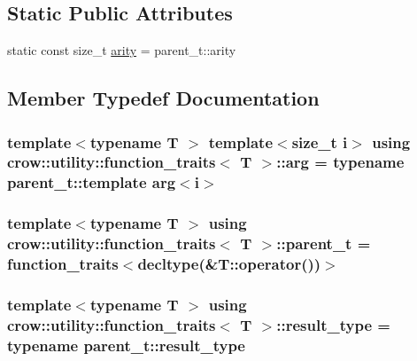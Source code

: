 \subsection*{Static Public Attributes}
\begin{DoxyCompactItemize}
\item 
static const size\-\_\-t \hyperlink{structcrow_1_1utility_1_1function__traits_a6736e81b2deba53e7441119cbbe04617}{arity} = parent\-\_\-t\-::arity
\end{DoxyCompactItemize}


\subsection{Member Typedef Documentation}
\hypertarget{structcrow_1_1utility_1_1function__traits_a1ccba1b795f8479631b7c2b4fc98314a}{
\subsubsection[{arg}]{\setlength{\rightskip}{0pt plus 5cm}template$<$typename T $>$ template$<$size\-\_\-t i$>$ using {\bf crow\-::utility\-::function\-\_\-traits}$<$ T $>$\-::{\bf arg} =  typename parent\-\_\-t\-::template {\bf arg}$<$i$>$}}\label{structcrow_1_1utility_1_1function__traits_a1ccba1b795f8479631b7c2b4fc98314a}
\hypertarget{structcrow_1_1utility_1_1function__traits_a6af347e0d7de1279042128f2d9d510d8}{
\subsubsection[{parent\-\_\-t}]{\setlength{\rightskip}{0pt plus 5cm}template$<$typename T $>$ using {\bf crow\-::utility\-::function\-\_\-traits}$<$ T $>$\-::{\bf parent\-\_\-t} =  {\bf function\-\_\-traits}$<$decltype(\&T\-::operator())$>$}}\label{structcrow_1_1utility_1_1function__traits_a6af347e0d7de1279042128f2d9d510d8}
\hypertarget{structcrow_1_1utility_1_1function__traits_af29025682cbe393fe3ae3c510d4993e6}{
\subsubsection[{result\-\_\-type}]{\setlength{\rightskip}{0pt plus 5cm}template$<$typename T $>$ using {\bf crow\-::utility\-::function\-\_\-traits}$<$ T $>$\-::{\bf result\-\_\-type} =  typename {\bf parent\-\_\-t\-::result\-\_\-type}}}\label{structcrow_1_1utility_1_1function__traits_af29025682cbe393fe3ae3c510d4993e6}


